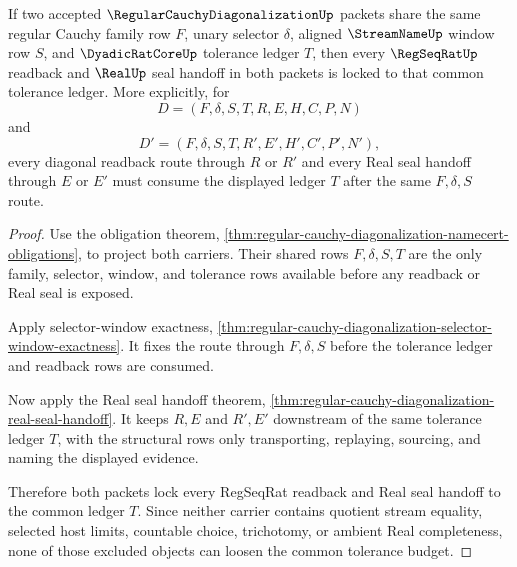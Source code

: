 \begin{theorem}
\label{thm:regular-cauchy-diagonalization-common-tolerance-lock}
If two accepted $\RegularCauchyDiagonalizationUp$ packets share the same regular Cauchy family row $F$, unary selector $\delta$, aligned $\StreamNameUp$ window row $S$, and $\DyadicRatCoreUp$ tolerance ledger $T$, then every $\RegSeqRatUp$ readback and $\RealUp$ seal handoff in both packets is locked to that common tolerance ledger. More explicitly, for
$$
D=(F,\delta,S,T,R,E,H,C,P,N)
$$
and
$$
D'=(F,\delta,S,T,R',E',H',C',P',N'),
$$
every diagonal readback route through $R$ or $R'$ and every Real seal handoff through $E$ or $E'$ must consume the displayed ledger $T$ after the same $F,\delta,S$ route.
\end{theorem}
\begin{proof}
Use the obligation theorem, \autoref{thm:regular-cauchy-diagonalization-namecert-obligations}, to project both carriers. Their shared rows $F,\delta,S,T$ are the only family, selector, window, and tolerance rows available before any readback or Real seal is exposed.

Apply selector-window exactness, \autoref{thm:regular-cauchy-diagonalization-selector-window-exactness}. It fixes the route through $F,\delta,S$ before the tolerance ledger and readback rows are consumed.

Now apply the Real seal handoff theorem, \autoref{thm:regular-cauchy-diagonalization-real-seal-handoff}. It keeps $R,E$ and $R',E'$ downstream of the same tolerance ledger $T$, with the structural rows only transporting, replaying, sourcing, and naming the displayed evidence.

Therefore both packets lock every RegSeqRat readback and Real seal handoff to the common ledger $T$. Since neither carrier contains quotient stream equality, selected host limits, countable choice, trichotomy, or ambient Real completeness, none of those excluded objects can loosen the common tolerance budget.
\end{proof}



